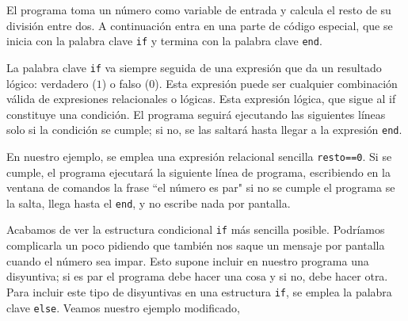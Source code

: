 



El programa toma un número como variable de entrada y calcula el resto de su división entre dos. A continuación entra en una parte de código especial, que se inicia con la palabra clave \texttt{if} y termina con la palabra clave \texttt{end}. 

La palabra clave \texttt{if} va siempre seguida de una expresión que da un resultado lógico: verdadero ($1$) o falso ($0$). Esta expresión puede ser cualquier combinación válida de expresiones relacionales o lógicas. Esta expresión lógica, que sigue al if constituye una condición. El programa seguirá ejecutando las siguientes líneas solo si la condición se cumple; si no, se las saltará hasta llegar a la expresión \texttt{end}.

En nuestro ejemplo, se emplea una expresión relacional sencilla \texttt{resto==0}. Si se cumple, el programa ejecutará la siguiente línea de programa, escribiendo en la ventana de comandos la frase ``el número es par"  si no se cumple el programa se la salta, llega hasta el \texttt{end}, y no escribe nada por pantalla. 

Acabamos de ver la estructura condicional \texttt{if} más sencilla posible. Podríamos complicarla un poco pidiendo que también nos saque un mensaje por pantalla cuando el número sea impar. Esto supone incluir en nuestro programa una disyuntiva; si es par el programa debe hacer una cosa y si no, debe hacer otra. Para incluir este tipo de disyuntivas en una estructura \texttt{if}, se emplea la palabra clave \texttt{else}. Veamos nuestro ejemplo modificado,


